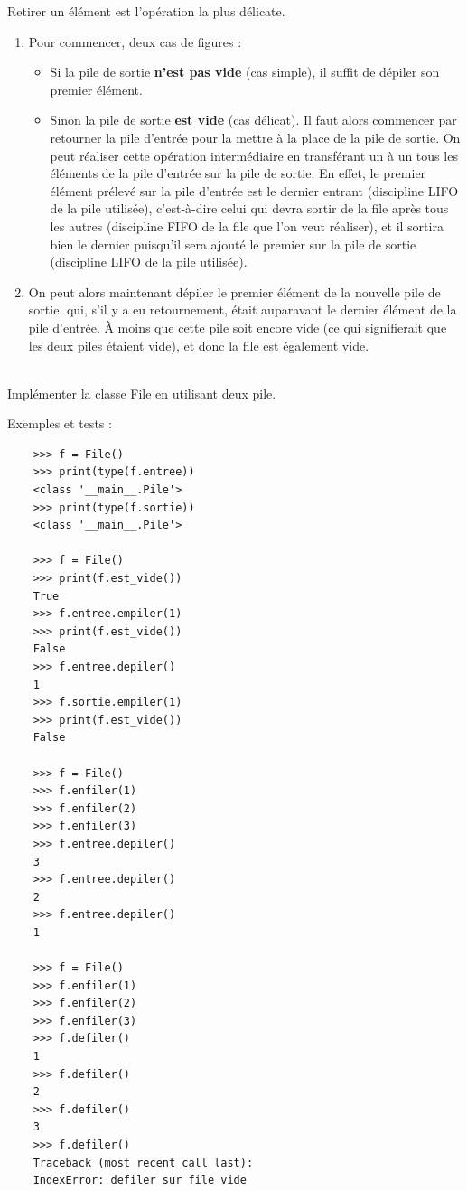 \documentclass[a4paper,17pt]{extarticle}
\newenvironment{eleve}%
{\begin{activite}\color{noiramu}\\[-0.5cm]}
{\end{activite}}
\providecommand{\tightlist}{%
      \setlength{\itemsep}{0pt}\setlength{\parskip}{0pt}}
\begin{document}
    Retirer un élément est l'opération la plus délicate.

\begin{enumerate}
\def\labelenumi{\arabic{enumi}.}
\tightlist
\item
  Pour commencer, deux cas de figures :

  \begin{itemize}
  \tightlist
  \item
    Si la pile de sortie \textbf{n'est pas vide} (cas simple), il suffit
    de dépiler son premier élément.
  \item
    Sinon la pile de sortie \textbf{est vide} (cas délicat). Il faut
    alors commencer par retourner la pile d'entrée pour la mettre à la
    place de la pile de sortie. On peut réaliser cette opération
    intermédiaire en transférant un à un tous les éléments de la pile
    d'entrée sur la pile de sortie. En effet, le premier élément prélevé
    sur la pile d'entrée est le dernier entrant (discipline LIFO de la
    pile utilisée), c'est-à-dire celui qui devra sortir de la file après
    tous les autres (discipline FIFO de la file que l'on veut réaliser),
    et il sortira bien le dernier puisqu'il sera ajouté le premier sur
    la pile de sortie (discipline LIFO de la pile utilisée).
  \end{itemize}
\item
  On peut alors maintenant dépiler le premier élément de la nouvelle
  pile de sortie, qui, s'il y a eu retournement, était auparavant le
  dernier élément de la pile d'entrée. À moins que cette pile soit
  encore vide (ce qui signifierait que les deux piles étaient vide), et
  donc la file est également vide.
\end{enumerate}
\begin{eleve}
    Implémenter la classe File en utilisant deux pile.

Exemples et tests :

\begin{verbatim}
    >>> f = File()
    >>> print(type(f.entree))
    <class '__main__.Pile'>
    >>> print(type(f.sortie))
    <class '__main__.Pile'>

    >>> f = File()
    >>> print(f.est_vide())
    True
    >>> f.entree.empiler(1)
    >>> print(f.est_vide())
    False
    >>> f.entree.depiler()
    1
    >>> f.sortie.empiler(1)
    >>> print(f.est_vide())
    False

    >>> f = File()
    >>> f.enfiler(1)
    >>> f.enfiler(2)
    >>> f.enfiler(3)
    >>> f.entree.depiler()
    3
    >>> f.entree.depiler()
    2
    >>> f.entree.depiler()
    1

    >>> f = File()
    >>> f.enfiler(1)
    >>> f.enfiler(2)
    >>> f.enfiler(3)
    >>> f.defiler()
    1
    >>> f.defiler()
    2
    >>> f.defiler()
    3
    >>> f.defiler()
    Traceback (most recent call last):
    IndexError: defiler sur file vide
\end{verbatim}
        
        \end{eleve}
\end{document}
